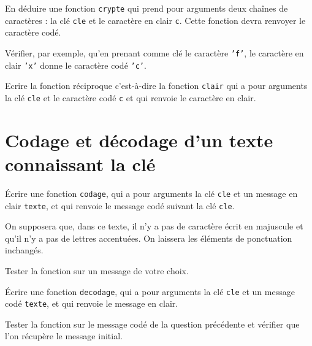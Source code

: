 \begin{question}
En déduire une fonction \texttt{crypte} qui prend pour arguments deux chaînes de caractères : la clé \texttt{cle} et le caractère en clair \texttt{c}. Cette fonction devra renvoyer le caractère codé.

Vérifier, par exemple, qu'en prenant comme clé le caractère \texttt{'f'}, le caractère en clair \texttt{'x'} donne le caractère codé \texttt{'c'}.
\end{question}

\begin{question}
Ecrire la fonction réciproque c'est-à-dire la fonction \texttt{clair} qui a pour arguments la clé \texttt{cle} et le caractère codé \texttt{c} et qui renvoie le caractère en clair.
\end{question}

\section*{Codage et décodage d'un texte connaissant la clé}

\begin{question}
\'Ecrire une fonction \texttt{codage}, qui a pour arguments la clé \texttt{cle} et un message en clair \texttt{texte}, et qui renvoie le message codé suivant la clé \texttt{cle}. 
\end{question}

On supposera que, dans ce texte, il n'y a pas de caractère écrit en majuscule et qu'il n'y a pas de lettres accentuées. On laissera les éléments de ponctuation inchangés.

\begin{question}
Tester la fonction sur un message de votre choix.
\end{question}

\begin{question}
\'Ecrire une fonction \texttt{decodage}, qui a pour arguments la clé \texttt{cle} et un message codé \texttt{texte}, et qui renvoie le message en clair.
\end{question}

\begin{question}
Tester la fonction sur le message codé de la question précédente et vérifier que l'on récupère le message initial.
\end{question}

